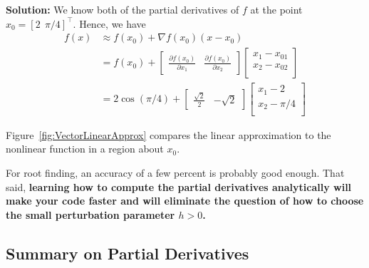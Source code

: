 \textbf{Solution:} We know both of the partial derivatives of $f$ at the point $x_0=[2~~\pi/4]^\top$. Hence, we have
\begin{equation}
    \label{eq:gradientExample}
    \begin{aligned}
  f(x) &\approx f(x_0) + \nabla f(x_0) (x-x_0)\\
    &= f(x_0)  + \left[\begin{array}{cc}
        \frac{\partial f(x_0)}{\partial x_1} &  \frac{\partial f(x_0)}{\partial x_2}
    \end{array} \right]  \left[\begin{array}{c}
        x_1-x_{01} \\
        x_2-x_{02} \\
           \end{array} \right]\\
    &= 2 \cos(\pi/4) + \left[
    \begin{array}{cc}
        \frac{\sqrt{2}}{2} & -\sqrt{2}\end{array} \right] \left[\begin{array}{c}
        x_1-2 \\
        x_2-\pi/4 \\
           \end{array} \right]
    \end{aligned}
\end{equation}

Figure~\ref{fig:VectorLinearApprox} compares the linear approximation to the nonlinear function in a region about $x_0$. 
\Qed

 
 
 
\begin{tcolorbox}[sharp corners, colback=green!30, colframe=green!80!blue,title=\textbf{Knowledge is Power}]
For root finding, an accuracy of a few percent is probably good enough. That said, \textbf{learning how to compute the partial derivatives analytically will make your code faster and will eliminate the question of how to choose the small perturbation parameter $h>0$.}
\end{tcolorbox}
  
  
\subsection{Summary on Partial Derivatives}
\label{sec:optional:CompactDerivativeNotation}

